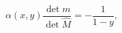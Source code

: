 \begin{equation}
  \label{eq:49}
  \alpha (x,y) \frac{\det m}{\det \hat{M}} = - \frac{1}{1-y},
\end{equation}

